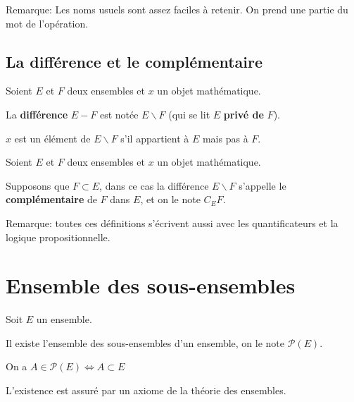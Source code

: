 \documentclass{article}
\begin{document}
Remarque: Les noms usuels sont assez faciles à retenir. On prend une partie du mot de l'opération.



\subsection{La différence et le complémentaire}

\begin{tcolorbox}[colback=red!5!white,colframe=red!75!black,title=Définition 2.5]

Soient $E$ et $F$ deux ensembles et $x$ un objet mathématique. 

La \textbf{différence} $E - F$ est notée $E \backslash F$ (qui se lit $E$ \textbf{privé de} $F$).

$x$ est un élément de $E \backslash F$ s'il appartient à $E$ mais pas à $F$.


\end{tcolorbox}


\begin{tcolorbox}[colback=red!5!white,colframe=red!75!black,title=Définition 2.6]

Soient $E$ et $F$ deux ensembles et $x$ un objet mathématique. 

Supposons que $F \subset E$, dans ce cas la différence $E \backslash F$ s'appelle le \textbf{complémentaire} de $F$ dans $E$, et on le note $C_{E} F$.



\end{tcolorbox}

Remarque: toutes ces définitions s'écrivent aussi avec les quantificateurs et la logique propositionnelle.

\section{Ensemble des sous-ensembles}

\begin{tcolorbox}[colback=red!5!white,colframe=red!75!black,title=Définition 2.7]

Soit $E$ un ensemble. 

Il existe l'ensemble des sous-ensembles d'un ensemble, on le note $\mathcal{P}(E)$. 

On a $A \in \mathcal{P}(E) \iff A \subset E$

\tcblower

L'existence est assuré par un axiome de la théorie des ensembles.

\end{tcolorbox}
\end{document}
